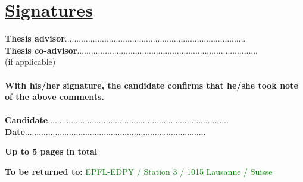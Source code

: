 \documentclass[11pt,titlepage]{article}
\begin{document}
\section*{\underline{Signatures}\\}
\noindent \textbf{Thesis advisor}\hspace{6.25cm}..............................................................................\vspace{0.5cm}\\

\noindent \textbf{Thesis co-advisor}\hspace{5.7cm}..............................................................................\\
\noindent  (if applicable)\\\\

\noindent \textbf{With his/her signature, the candidate confirms that he/she took note of the above comments.}\\\\
\textbf{Candidate}\hspace{7cm}..............................................................................\vspace{0.5cm}\\

\noindent \textbf{Date}\hspace{8.05cm}..............................................................................\\

\vspace{0.8cm}
\begin{center}
\textbf{Up to 5 pages in total}
\end{center}
\begin{center}
\textbf{To be returned to:} \textcolor{green}{EPFL-EDPY / Station 3 / 1015 Lausanne / Suisse}
\end{center}
\end{document}
